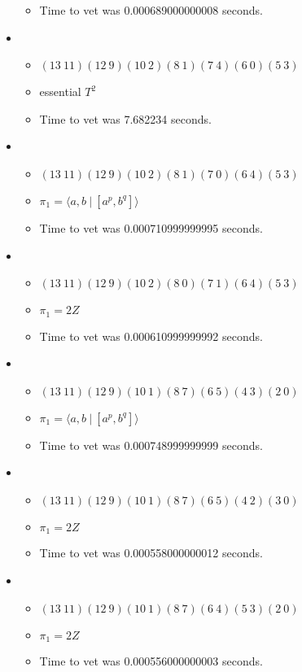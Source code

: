 \documentclass{article}
\begin{document}
\begin{itemize}
\begin{itemize}
      \item Time to vet was 0.000689000000008 seconds.
\end{itemize}
\item \begin{itemize}
      \item $(13\ 11)(12\ 9)(10\ 2)(8\ 1)(7\ 4)(6\ 0)(5\ 3)$
      \item essential $T^2$
      \item Time to vet was 7.682234 seconds.
\end{itemize}
\item \begin{itemize}
      \item $(13\ 11)(12\ 9)(10\ 2)(8\ 1)(7\ 0)(6\ 4)(5\ 3)$
      \item $\pi_1 = \langle a,b\ |\ [a^p,b^q]\rangle$
      \item Time to vet was 0.000710999999995 seconds.
\end{itemize}
\item \begin{itemize}
      \item $(13\ 11)(12\ 9)(10\ 2)(8\ 0)(7\ 1)(6\ 4)(5\ 3)$
      \item $\pi_1 =2 Z$
      \item Time to vet was 0.000610999999992 seconds.
\end{itemize}
\item \begin{itemize}
      \item $(13\ 11)(12\ 9)(10\ 1)(8\ 7)(6\ 5)(4\ 3)(2\ 0)$
      \item $\pi_1 = \langle a,b\ |\ [a^p,b^q]\rangle$
      \item Time to vet was 0.000748999999999 seconds.
\end{itemize}
\item \begin{itemize}
      \item $(13\ 11)(12\ 9)(10\ 1)(8\ 7)(6\ 5)(4\ 2)(3\ 0)$
      \item $\pi_1 =2 Z$
      \item Time to vet was 0.000558000000012 seconds.
\end{itemize}
\item \begin{itemize}
      \item $(13\ 11)(12\ 9)(10\ 1)(8\ 7)(6\ 4)(5\ 3)(2\ 0)$
      \item $\pi_1 =2 Z$
      \item Time to vet was 0.000556000000003 seconds.

\end{itemize}
\end{itemize}
\end{document}
